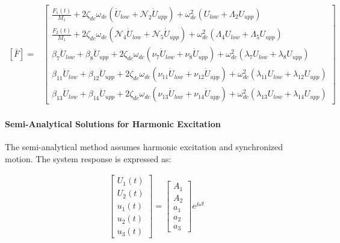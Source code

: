 \documentclass[12pt,a4paper]{article}
\begin{document}
\begin{equation}\label{Eq.force_vector_dimensionless}
\begin{aligned}
[\bar{F}] = & \begin{bmatrix}
\frac{F_1(t)}{M_1} + 2 \zeta_{dc} \omega_{dc} (\dot{U}_{low} + \mathcal{N}_2 \dot{U}_{upp}) + \omega_{dc}^2 (U_{low} + \Lambda_2 U_{upp})\\
\frac{F_2(t)}{M_1} + 2 \zeta_{dc} \omega_{dc} (\mathcal{N}_4 \dot{U}_{low} + \mathcal{N}_5 \dot{U}_{upp}) + \omega_{dc}^2 (\Lambda_4 U_{low} + \Lambda_5 U_{upp}) \\
\beta_7 \ddot{U}_{low} +  \beta_8 \ddot{U}_{upp} +  2 \zeta_{dc} \omega_{dc} (\nu_7 \dot{U}_{low} + \nu_8 \dot{U}_{upp}) +\omega_{dc}^2 (\lambda_7 U_{low} + \lambda_8 U_{upp})\\
\beta_{11} \ddot{U}_{low} +  \beta_{12} \ddot{U}_{upp} +  2 \zeta_{dc} \omega_{dc} (\nu_{11} \dot{U}_{low} + \nu_{12} \dot{U}_{upp}) +\omega_{dc}^2 (\lambda_{11} U_{low} + \lambda_{12} U_{upp})\\
\beta_{13} \ddot{U}_{low} +  \beta_{14} \ddot{U}_{upp} +  2 \zeta_{dc} \omega_{dc} (\nu_{13} \dot{U}_{low} + \nu_{14} \dot{U}_{upp}) +\omega_{dc}^2 (\lambda_{13} U_{low} + \lambda_{14} U_{upp})
\end{bmatrix}
\end{aligned}
\end{equation}

\paragraph{Semi-Analytical Solutions for Harmonic Excitation}

The semi-analytical method assumes harmonic excitation and synchronized motion. The system response is expressed as:

\begin{align}\label{Eq.harmonic.solution.2dof3dof}
    \begin{bmatrix}
        U_1(t) \\
        U_2(t) \\
        u_1(t) \\
        u_2(t) \\
        u_3(t)
    \end{bmatrix} =
    \begin{bmatrix}
        A_1 \\
        A_2 \\
        a_1 \\
        a_2 \\
        a_3
    \end{bmatrix} e^{j \omega t}
\end{align}
\end{document}
